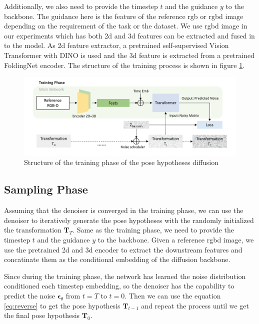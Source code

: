 \documentclass[12pt,DIV14,BCOR12mm,a4paper,footinclude=false,headinclude,parskip=half-,twoside,openright,cleardoublepage=empty,toc=index,bibliography=totoc,listof=totoc]{scrreprt}
\numberwithin{equation}{chapter}
\begin{document}
Additionally, we also need to provide the timestep $t$ and the guidance $y$ to the backbone. The guidance here is the feature of the reference \gls{rgb} or \gls{rgbd} image depending on the requirement of the task or the dataset. We use \gls{rgbd} image in our experiments which has both \gls{2d} and \gls{3d} features can be extracted and fused in to the model. As \gls{2d} feature extractor, a pretrained self-supervised Vision Transformer
 with DINO\cite{caron2021emerging} is used and the \gls{3d} feature is extracted from a pretrained FoldingNet encoder\cite{yang2018foldingnet}. The structure of the training process is shown in figure \ref{img:train}.

\begin{figure}[h]
	\centering
	\includegraphics[scale=.235]{img/train.png}
	\caption{Structure of the training phase of the pose hypotheses diffusion}
	\label{img:train}
\end{figure}

\subsection{Sampling Phase}
Assuming that the denoiser is converged in the training phase, we can use the denoiser to iteratively generate the pose hypotheses with the randomly initialized the transformation $\mathbf{T}_{T}$. Same as the training phase, we need to provide the timestep $t$ and the guidance $y$ to the backbone. Given a reference \gls{rgbd} image, we use the pretrained \gls{2d} and \gls{3d} encoder to extract the downstream features and concatinate them as the conditional embedding of the diffusion backbone. 

Since during the training phase, the network has learned the noise distribution conditioned each timestep embedding, so the denoiser has the capability to predict the noise $\boldsymbol{\epsilon}_{\theta}$ from $t=T$ to $t=0$. Then we can use the equation \ref{eq:reverse} to get the pose hypothesis $\mathbf{T}_{t-1}$ and repeat the process until we get the final pose hypothesis $\mathbf{T}_{0}$. 
\end{document}
